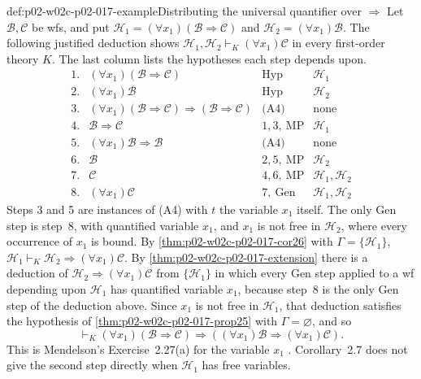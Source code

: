 \begin{hbexample}{def:p02-w02c-p02-017-example}{Distributing the universal quantifier over \(\Rightarrow\)}
Let \(\mathscr B,\mathscr C\) be wfs, and put
\(\mathscr H_1=(\forall x_1)(\mathscr B\Rightarrow\mathscr C)\) and
\(\mathscr H_2=(\forall x_1)\mathscr B\).  The following justified deduction
shows \(\mathscr H_1,\mathscr H_2\vdash_K(\forall x_1)\mathscr C\) in every
first-order theory \(K\).  The last column lists the hypotheses each step
depends upon.
\[
\begin{array}{rlll}
 1. & (\forall x_1)(\mathscr B\Rightarrow\mathscr C) & \text{Hyp} & \mathscr H_1\\
 2. & (\forall x_1)\mathscr B & \text{Hyp} & \mathscr H_2\\
 3. & (\forall x_1)(\mathscr B\Rightarrow\mathscr C)\Rightarrow
      (\mathscr B\Rightarrow\mathscr C) & \text{(A4)} & \text{none}\\
 4. & \mathscr B\Rightarrow\mathscr C & 1,3,\ \text{MP} & \mathscr H_1\\
 5. & (\forall x_1)\mathscr B\Rightarrow\mathscr B & \text{(A4)} & \text{none}\\
 6. & \mathscr B & 2,5,\ \text{MP} & \mathscr H_2\\
 7. & \mathscr C & 4,6,\ \text{MP} & \mathscr H_1,\mathscr H_2\\
 8. & (\forall x_1)\mathscr C & 7,\ \text{Gen} & \mathscr H_1,\mathscr H_2
\end{array}
\]
Steps 3 and 5 are instances of (A4) with \(t\) the variable \(x_1\) itself.
The only Gen step is step~8, with quantified variable \(x_1\), and \(x_1\) is
not free in \(\mathscr H_2\), where every occurrence of \(x_1\) is bound.  By
\cref{thm:p02-w02c-p02-017-cor26} with \(\Gamma=\{\mathscr H_1\}\),
\(\mathscr H_1\vdash_K\mathscr H_2\Rightarrow(\forall x_1)\mathscr C\).  By
\cref{thm:p02-w02c-p02-017-extension} there is a deduction of
\(\mathscr H_2\Rightarrow(\forall x_1)\mathscr C\) from \(\{\mathscr H_1\}\)
in which every Gen step applied to a wf depending upon \(\mathscr H_1\) has
quantified variable \(x_1\), because step~8 is the only Gen step of the
deduction above.  Since \(x_1\) is not free in \(\mathscr H_1\), that deduction
satisfies the hypothesis of \cref{thm:p02-w02c-p02-017-prop25} with
\(\Gamma=\varnothing\), and so
\[
 \vdash_K(\forall x_1)(\mathscr B\Rightarrow\mathscr C)\Rightarrow
 ((\forall x_1)\mathscr B\Rightarrow(\forall x_1)\mathscr C).
\]
This is Mendelson's Exercise~2.27(a) for the variable \(x_1\)
\cite[\S 2.4, p.~75]{Mendelson1997}.  Corollary~2.7 does not give the second
step directly when \(\mathscr H_1\) has free variables.
\end{hbexample}

